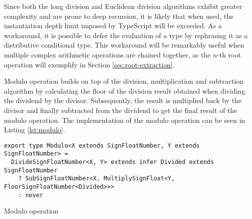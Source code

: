 Since both the long division and Euclidean division algorithms exhibit greater complexity and are prone to deep recursion, it is likely that when used, the instantiation depth limit imposed by TypeScript will be exceeded. As a workaround, it is possible to defer the evaluation of a type by rephrasing it as a distributive conditional type. This workaround will be remarkably useful when multiple complex arithmetic operations are chained together, as the $n$-th root operation will exemplify in Section \ref{sec:root-extraction}.

Modulo operation builds on top of the division, multiplication and subtraction algorithm by calculating the floor of the division result obtained when dividing the dividend by the divisor. Subsequently, the result is multiplied back by the divisor and finally subtracted from the dividend to get the final result of the modulo operation. The implementation of the modulo operation can be seen in Listing \ref{lst:modulo}.

\begin{listing}[ht]
  \begin{verbatim}
export type Modulo<X extends SignFloatNumber, Y extends SignFloatNumber> =
  DivideSignFloatNumber<X, Y> extends infer Divided extends SignFloatNumber
    ? SubSignFloatNumber<X, MultiplySignFloat<Y, FloorSignFloatNumber<Divided>>>
    : never
  \end{verbatim}
  \caption{Modulo operation}\label{lst:modulo}
\end{listing}
